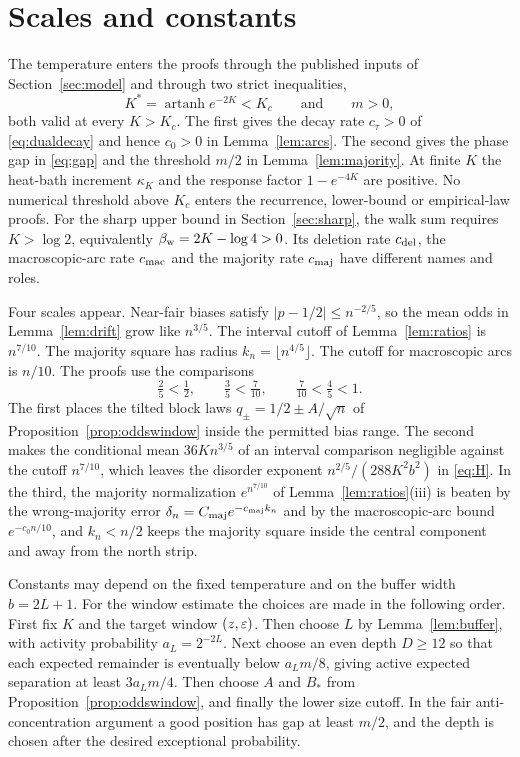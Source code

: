 \section{Scales and constants}\label{sec:constants}
The temperature enters the proofs through the published inputs of Section~\ref{sec:model} and through two strict inequalities,
\[
 K^*=\operatorname{artanh}e^{-2K}<K_c\qquad\text{and}\qquad m>0,
\]
both valid at every $K>K_c$. The first gives the decay rate $c_\tau>0$ of \eqref{eq:dualdecay} and hence $c_0>0$ in Lemma~\ref{lem:arcs}. The second gives the phase gap in \eqref{eq:gap} and the threshold $m/2$ in Lemma~\ref{lem:majority}. At finite $K$ the heat-bath increment $\kappa_K$ and the response factor $1-e^{-4K}$ are positive. No numerical threshold above $K_c$ enters the recurrence, lower-bound or empirical-law proofs. For the sharp upper bound in Section~\ref{sec:sharp}, the walk sum requires $K>\log2$, equivalently $\beta_{\rm w}=2K-\log4>0$. Its deletion rate $c_{\rm del}$, the macroscopic-arc rate $c_{\rm mac}$ and the majority rate $c_{\rm maj}$ have different names and roles.

Four scales appear. Near-fair biases satisfy $|p-1/2|\le n^{-2/5}$, so the mean odds in Lemma~\ref{lem:drift} grow like $n^{3/5}$. The interval cutoff of Lemma~\ref{lem:ratios} is $n^{7/10}$. The majority square has radius $k_n=\lfloor n^{4/5}\rfloor$. The cutoff for macroscopic arcs is $n/10$. The proofs use the comparisons
\[
 \tfrac25<\tfrac12,\qquad
 \tfrac35<\tfrac7{10},\qquad
 \tfrac7{10}<\tfrac45<1.
\]
The first places the tilted block laws $q_\pm=1/2\pm A/\sqrt n$ of Proposition~\ref{prop:oddswindow} inside the permitted bias range. The second makes the conditional mean $36Kn^{3/5}$ of an interval comparison negligible against the cutoff $n^{7/10}$, which leaves the disorder exponent $n^{2/5}/(288K^2b^2)$ in \eqref{eq:H}. In the third, the majority normalization $e^{n^{7/10}}$ of Lemma~\ref{lem:ratios}(iii) is beaten by the wrong-majority error $\delta_n=C_{\rm maj}e^{-c_{\rm maj}k_n}$ and by the macroscopic-arc bound $e^{-c_0n/10}$, and $k_n<n/2$ keeps the majority square inside the central component and away from the north strip.

Constants may depend on the fixed temperature and on the buffer width $b=2L+1$. For the window estimate the choices are made in the following order. First fix $K$ and the target window $(z,\varepsilon)$. Then choose $L$ by Lemma~\ref{lem:buffer}, with activity probability $a_L=2^{-2L}$. Next choose an even depth $D\ge12$ so that each expected remainder is eventually below $a_Lm/8$, giving active expected separation at least $3a_Lm/4$. Then choose $A$ and $B_*$ from Proposition~\ref{prop:oddswindow}, and finally the lower size cutoff. In the fair anti-concentration argument a good position has gap at least $m/2$, and the depth is chosen after the desired exceptional probability.

